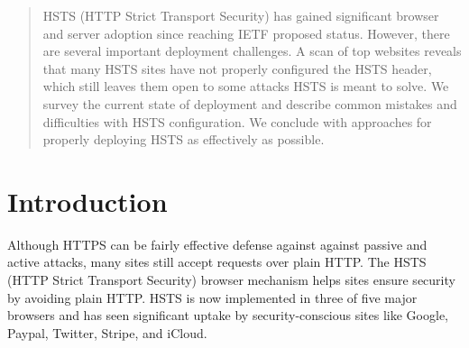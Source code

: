 \documentclass{acm_proc_article-sp}
\begin{document}
\date{October 08, 2013}

\maketitle
\begin{abstract}
HSTS (HTTP Strict Transport Security) has gained significant browser and server adoption since reaching IETF proposed status. However, there are several important deployment challenges. A scan of top websites reveals that many HSTS sites have not properly configured the HSTS header, which still leaves them open to some attacks HSTS is meant to solve. We survey the current state of deployment and describe common mistakes and difficulties with HSTS configuration. We conclude with approaches for properly deploying HSTS as effectively as possible.\end{abstract}





\section{Introduction}
\label{sec:intro}

Although HTTPS can be fairly effective defense against against passive and active attacks, many sites still accept requests over plain HTTP. The HSTS (HTTP Strict Transport Security) browser mechanism helps sites ensure security by avoiding plain HTTP. HSTS is now implemented in three of five major browsers and has seen significant uptake by security-conscious sites like Google, Paypal, Twitter, Stripe, and iCloud.
\end{document}

